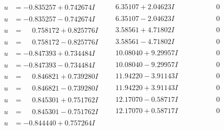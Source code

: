 \documentclass[1p]{elsarticle_modified}
\theoremstyle{definition}
\begin{document}
$$\begin{array}{c|c|c}
 \hline 
\begin{aligned}
u &= -0.835257 + 0.742674 I\end{aligned}
 & \phantom{-}6.35107 + 2.04623 I & \phantom{-0.000000 } 0 \\ \hline\begin{aligned}
u &= -0.835257 - 0.742674 I\end{aligned}
 & \phantom{-}6.35107 - 2.04623 I & \phantom{-0.000000 } 0 \\ \hline\begin{aligned}
u &= \phantom{-}0.758172 + 0.825776 I\end{aligned}
 & \phantom{-}3.58561 + 4.71802 I & \phantom{-0.000000 } 0 \\ \hline\begin{aligned}
u &= \phantom{-}0.758172 - 0.825776 I\end{aligned}
 & \phantom{-}3.58561 - 4.71802 I & \phantom{-0.000000 } 0 \\ \hline\begin{aligned}
u &= -0.847393 + 0.734484 I\end{aligned}
 & \phantom{-}10.08040 + 9.29957 I & \phantom{-0.000000 } 0 \\ \hline\begin{aligned}
u &= -0.847393 - 0.734484 I\end{aligned}
 & \phantom{-}10.08040 - 9.29957 I & \phantom{-0.000000 } 0 \\ \hline\begin{aligned}
u &= \phantom{-}0.846821 + 0.739280 I\end{aligned}
 & \phantom{-}11.94220 - 3.91143 I & \phantom{-0.000000 } 0 \\ \hline\begin{aligned}
u &= \phantom{-}0.846821 - 0.739280 I\end{aligned}
 & \phantom{-}11.94220 + 3.91143 I & \phantom{-0.000000 } 0 \\ \hline\begin{aligned}
u &= \phantom{-}0.845301 + 0.751762 I\end{aligned}
 & \phantom{-}12.17070 - 0.58717 I & \phantom{-0.000000 } 0 \\ \hline\begin{aligned}
u &= \phantom{-}0.845301 - 0.751762 I\end{aligned}
 & \phantom{-}12.17070 + 0.58717 I & \phantom{-0.000000 } 0 \\ \hline\begin{aligned}
u &= -0.844440 + 0.757264 I\end{aligned}

\end{array}$$
\end{document}
